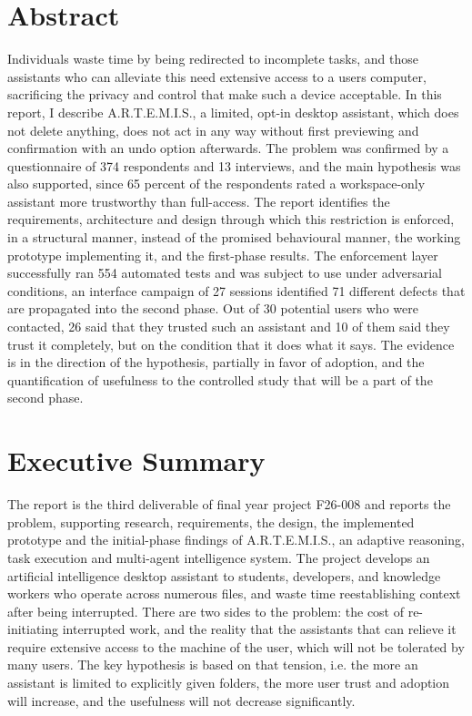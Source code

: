 \documentclass{FastFyp}
\begin{document}
\section*{Abstract}
Individuals waste time by being redirected to incomplete tasks, and those assistants who can alleviate this need extensive access to a users computer, sacrificing the privacy and control that make such a device acceptable. In this report, I describe A.R.T.E.M.I.S., a limited, opt-in desktop assistant, which does not delete anything, does not act in any way without first previewing and confirmation with an undo option afterwards. The problem was confirmed by a questionnaire of 374 respondents and 13 interviews, and the main hypothesis was also supported, since 65 percent of the respondents rated a workspace-only assistant more trustworthy than full-access. The report identifies the requirements, architecture and design through which this restriction is enforced, in a structural manner, instead of the promised behavioural manner, the working prototype implementing it, and the first-phase results. The enforcement layer successfully ran 554 automated tests and was subject to use under adversarial conditions, an interface campaign of 27 sessions identified 71 different defects that are propagated into the second phase. Out of 30 potential users who were contacted, 26 said that they trusted such an assistant and 10 of them said they trust it completely, but on the condition that it does what it says. The evidence is in the direction of the hypothesis, partially in favor of adoption, and the quantification of usefulness to the controlled study that will be a part of the second phase.
\pagebreak

\section*{Executive Summary}
The report is the third deliverable of final year project F26-008 and reports the problem, supporting research, requirements, the design, the implemented prototype and the initial-phase findings of A.R.T.E.M.I.S., an adaptive reasoning, task execution and multi-agent intelligence system. The project develops an artificial intelligence desktop assistant to students, developers, and knowledge workers who operate across numerous files, and waste time reestablishing context after being interrupted. There are two sides to the problem: the cost of re-initiating interrupted work, and the reality that the assistants that can relieve it require extensive access to the machine of the user, which will not be tolerated by many users. The key hypothesis is based on that tension, i.e. the more an assistant is limited to explicitly given folders, the more user trust and adoption will increase, and the usefulness will not decrease significantly.
\end{document}
